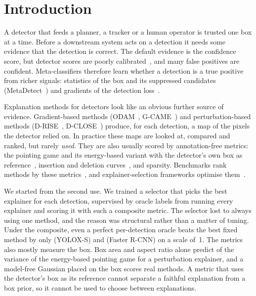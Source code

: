\section{Introduction}
\label{sec:intro}

A detector that feeds a planner, a tracker or a human operator is trusted one
box at a time. Before a downstream system acts on a detection it needs some
evidence that the detection is correct. The default evidence is the confidence
score, but detector scores are poorly calibrated~\cite{kuzucu2024calibration,oksuz2023saod},
and many false positives are confident.
Meta-classifiers therefore learn whether a detection is a true positive from
richer signals: statistics of the box and its suppressed candidates
(MetaDetect~\cite{schubert2021metadetect}) and gradients of the detection
loss~\cite{riedlinger2023gradient}.

Explanation methods for detectors look like an obvious further source of
evidence. Gradient-based methods (ODAM~\cite{zhao2023odam}, G-CAME~\cite{nguyen2024gcame})
and perturbation-based methods (D-RISE~\cite{petsiuk2021drise}, D-CLOSE~\cite{truong2023dclose})
produce, for each detection, a map of the pixels the detector relied on.
In practice these maps are looked at, compared and ranked, but rarely
\emph{used}. They are also usually scored by annotation-free metrics:
the pointing game and its energy-based variant with the detector's own box as
reference~\cite{zhang2016excitation,wang2020scorecam}, insertion and deletion
curves~\cite{petsiuk2018rise}, and sparsity. Benchmarks rank methods by these
metrics~\cite{nguyen2025odexai}, and explainer-selection frameworks optimise
them~\cite{cugny2022autoxai}.

We started from the second use. We trained a selector that picks the best
explainer for each detection, supervised by oracle labels from running every
explainer and scoring it with such a composite metric. The selector lost to
always using one method, and the reason was structural rather than a matter
of tuning. Under the composite, even a perfect per-detection oracle beats the
best fixed method by only  (YOLOX-S) and 
(Faster R-CNN) on a scale of~1. The metrics also mostly measure the box.
Box area and aspect ratio alone predict  of the variance of the
energy-based pointing game for a perturbation explainer, and a model-free
Gaussian placed on the box scores  real
methods. A metric that uses the detector's box as its reference cannot
separate a faithful explanation from a box prior, so it cannot be used to
choose between explanations.

